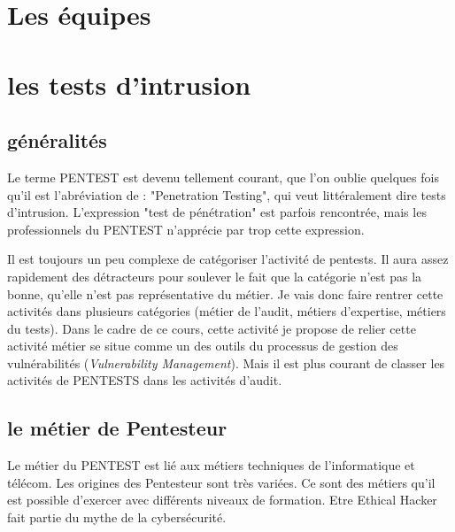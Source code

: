 \section{Les équipes}







\section{les tests d'intrusion}

\subsection{généralités}

Le terme PENTEST est devenu tellement courant, que l'on oublie quelques fois qu'il est l'abréviation de : "Penetration Testing", qui  veut littéralement dire tests d'intrusion.  L'expression  "test de pénétration" est parfois rencontrée, mais les professionnels du PENTEST n'apprécie par trop cette expression. 

Il est toujours un peu complexe de catégoriser l'activité de pentests. Il aura assez rapidement des détracteurs pour soulever le fait que la catégorie n'est pas la bonne, qu'elle n'est pas représentative du métier. 
Je vais donc faire rentrer cette activités dans plusieurs catégories (métier de l'audit, métiers d'expertise, métiers du tests).
Dans le cadre de ce cours, cette activité je propose de relier cette activité métier se situe comme un des outils du processus de gestion des vulnérabilités (\emph{Vulnerability Management}).  Mais il est plus courant de  classer les activités de PENTESTS dans les activités d'audit.

\subsection{le métier de Pentesteur}

Le métier du PENTEST est  lié aux métiers techniques de l'informatique et télécom. Les origines des Pentesteur sont très variées.
Ce sont des métiers qu'il est possible d'exercer avec différents niveaux de formation. 
Etre Ethical Hacker fait partie du mythe de la cybersécurité.


